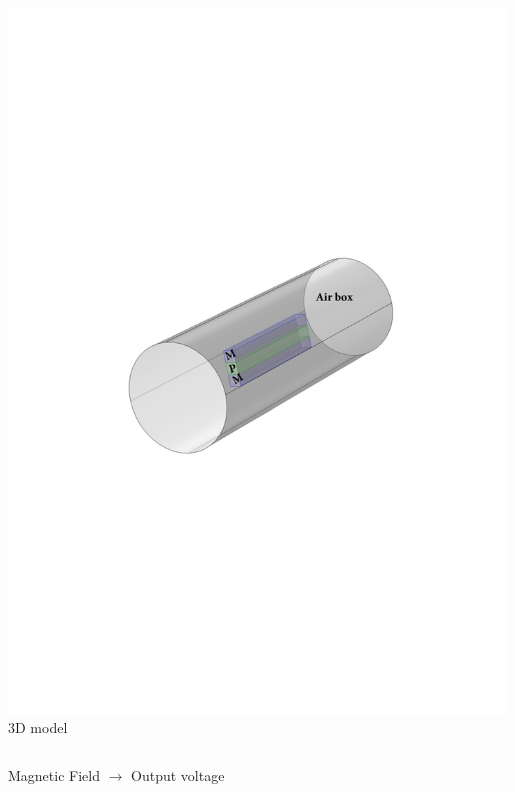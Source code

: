 \documentclass[compress]{beamer}
\begin{document}
\begin{frame}
\begin{columns}[totalwidth=\textwidth]
\begin{column}{.5\textwidth}
 	\includegraphics[width=0.99\textwidth]{Graphic/02_geo.pdf}
	3D model
	\end{column}
\end{columns}
\vspace{0.5cm}
\begin{exampleblock}{} 
  \centering
  Magnetic Field {\color{red} \Large$\mathbf{\boldsymbol{\rightarrow}}$} Output voltage
\end{exampleblock}	
\end{frame}
\end{document}
